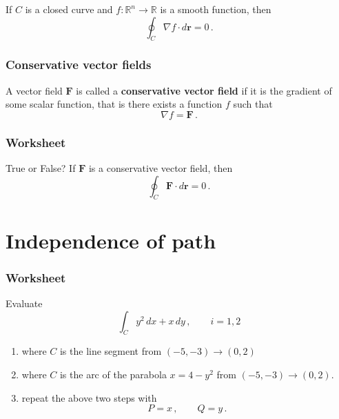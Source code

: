 \documentclass[aspectratio=169]{beamer}
\begin{document}
\begin{frame}
\begin{corollary}
If \(C\) is a closed curve and \(f:\mathbb{R}^n \to \mathbb{R}\) is a smooth function,
then
\begin{equation*}
    \oint_C \nabla f \cdot d\mathbf{r}  = 0 \,.
\end{equation*}
\end{corollary}
\end{frame}

\begin{frame}
    \frametitle{Conservative vector fields}
\begin{definition}
A vector field \(\mathbf{F}\) is called a \textbf{conservative vector field}
if it is the gradient of some scalar function, that is there exists
a function \(f\) such that
\begin{equation*}
    \nabla f = \mathbf{F} \,.
\end{equation*}
\end{definition}
\end{frame}

\begin{frame}
    \frametitle{Worksheet}
         True or False? 
If \(\mathbf{F}\) is a conservative vector field, then
\begin{equation*}
    \oint_C \mathbf{F} \cdot d\mathbf{r} = 0 \,.
\end{equation*}

\end{frame}

\section{Independence of path}

\begin{frame}
    \frametitle{Worksheet}
    Evaluate
    \begin{equation*}
        \int_{C} y^2 \, dx + x\, dy \,, \qquad i = 1,2
    \end{equation*}
    \begin{enumerate}
        \item where \(C\) is the line segment from \((-5,-3) \to (0,2)\) 
        \item where \(C\) is the arc of the parabola \(x = 4-y^2\) from \((-5,-3) \to (0,2)\).
        \item repeat the above two steps with 
            \begin{equation*}
                P = x\,, \qquad Q = y \,.
            \end{equation*}
    \end{enumerate}
\end{frame}
\end{document}
